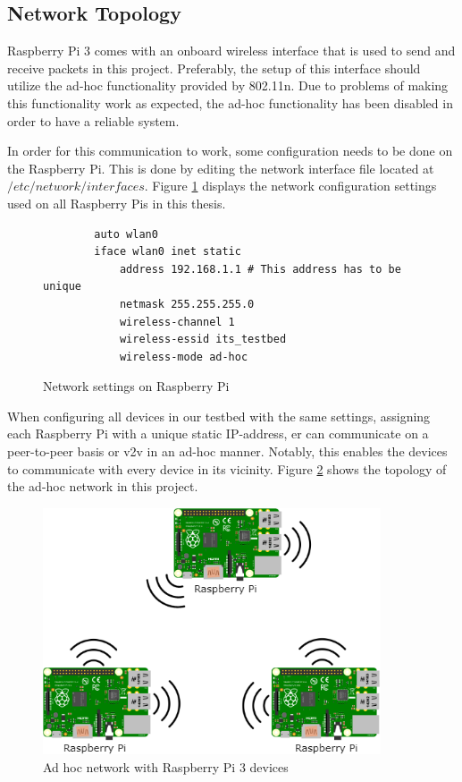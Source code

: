 \subsection{Network Topology}
Raspberry Pi 3 comes with an onboard wireless interface that is used to send and receive packets in this project. Preferably, the setup of this interface should utilize the ad-hoc functionality provided by 802.11n. Due to problems of making this functionality work as expected, the ad-hoc functionality has been disabled in order to have a reliable system. 

In order for this communication to work, some configuration needs to be done on the Raspberry Pi. This is done by editing the network interface file located at $/etc/network/interfaces$. Figure \ref{fig:network-settings} displays the network configuration settings used on all Raspberry Pis in this thesis.

\begin{figure}
    \centering
    \begin{verbatim}
        auto wlan0
        iface wlan0 inet static
            address 192.168.1.1 # This address has to be unique
            netmask 255.255.255.0
            wireless-channel 1
            wireless-essid its_testbed
            wireless-mode ad-hoc
    \end{verbatim}
    \caption{\label{fig:network-settings}Network settings on Raspberry Pi}
\end{figure}

When configuring all devices in our testbed with the same settings, assigning each Raspberry Pi with a unique static IP-address, er can communicate on a peer-to-peer basis or \gls{v2v} in an ad-hoc manner. Notably, this enables the devices to communicate with every device in its vicinity. Figure \ref{fig:raspi-ad-hoc} shows the topology of the ad-hoc network in this project.

\begin{figure}
\centering
\includegraphics[width=10cm]{figs/raspi-ad-hoc.png}
\caption{Ad hoc network with Raspberry Pi 3 devices}
\label{fig:raspi-ad-hoc}
\end{figure}

